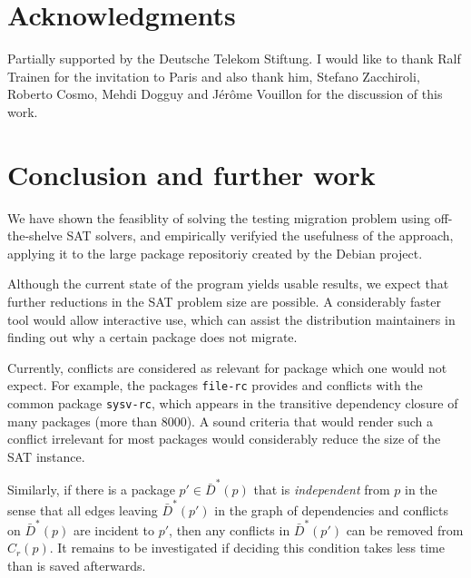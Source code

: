 \documentclass[halfparskip,11pt]{scrartcl}
\begin{document}
\section{Acknowledgments}

Partially supported by the Deutsche Telekom Stiftung. I would like to thank Ralf Trainen for the invitation to Paris and also thank him, Stefano Zacchiroli, Roberto Cosmo, Mehdi Dogguy and Jérôme Vouillon for the discussion of this work.

\section{Conclusion and further work}

We have shown the feasiblity of solving the testing migration problem using off-the-shelve SAT solvers, and empirically verifyied the usefulness of the approach, applying it to the large package repositoriy created by the Debian project.

Although the current state of the program yields usable results, we expect that further reductions in the SAT problem size are possible. A considerably faster tool would allow interactive use, which can assist the distribution maintainers in finding out why a certain package does not migrate.

Currently, conflicts are considered as relevant for package which one would not expect. For example, the packages \texttt{file-rc} provides and conflicts with the common package \texttt{sysv-rc}, which appears in the transitive dependency closure of many packages (more than 8000). A sound criteria that would render such a conflict irrelevant for most packages would considerably reduce the size of the SAT instance.

Similarly, if there is a package $p'\in \bar D^*(p)$ that is \emph{independent} from $p$ in the sense that all edges leaving $\bar D^*(p')$ in the graph of dependencies and conflicts on $\bar D^*(p)$ are incident to $p'$, then any conflicts in $\bar D^*(p')$ can be removed from $C_r(p)$. It remains to be investigated if deciding this condition takes less time than is saved afterwards.




\end{document}
